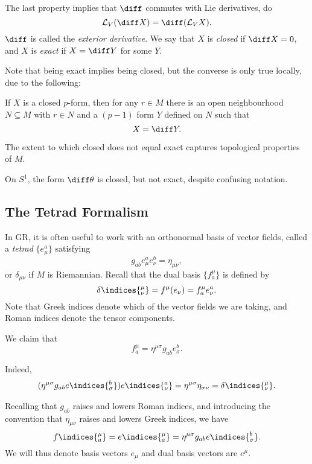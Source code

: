 \documentclass[12pt]{article}
\begin{document}
The last property implies that $\diff$ commutes with Lie derivatives, do
\[
\mathcal{L}_V(\diff X) = \diff (\mathcal{L}_V X).
\]
$\diff$ is called the \emph{exterior derivative}. We say that $X$ is \emph{closed} if $\diff X = 0$, and $X$ is \emph{exact} if $X = \diff Y$ for some $Y$.

Note that being exact implies being closed, but the converse is only true locally, due to the following:
\begin{lemma}
	If $X$ is a closed $p$-form, then for any $r \in M$ there is an open neighbourhood $N \subseteq M$ with $r \in N$ and a $(p-1)$ form $Y$ defined on $N$ such that
	\[
	X = \diff Y.
	\]
\end{lemma}
The extent to which closed does not equal exact captures topological properties of $M$.
\begin{exbox}
	On $S^1$, the form $\diff \theta$ is closed, but not exact, despite confusing notation.
\end{exbox}

\subsection{The Tetrad Formalism}%
\label{sub:ttf}

In GR, it is often useful to work with an orthonormal basis of vector fields, called a \emph{tetrad} $\{e_\mu^a\}$ satisfying
\[
g_{ab} e_\mu^a e_\nu^b = \eta_{\mu\nu},
\]
or $\delta_{\mu\nu}$ if $M$ is Riemannian. Recall that the dual basis $\{f_a^\mu\}$ is defined by
\[
\delta\indices{^{\mu}_{\nu}} = f^\mu(e_\nu) = f^{\mu}_a e^{a}_\nu.
\]
Note that Greek indices denote which of the vector fields we are taking, and Roman indices denote the tensor components.

We claim that
\[
f^{\mu}_a = \eta^{\mu\sigma} g_{ab} e^{b}_\sigma.
\]

\begin{proofbox}
	Indeed,
	\begin{align*}
		(\eta^{\mu\sigma} g_{ab} e\indices{^{b}_{\sigma}}) e\indices{^{a}_{\nu}} = \eta^{\mu\sigma} \eta_{\sigma\nu} = \delta\indices{^{\mu}_{\nu}}.
	\end{align*}
\end{proofbox}

Recalling that $g_{ab}$ raises and lowers Roman indices, and introducing the convention that $\eta_{\mu\nu}$ raises and lowers Greek indices, we have
\[
f\indices{^{\mu}_{a}} = e\indices{^{\mu}_{a}} = \eta^{\mu\sigma} g_{ab} e\indices{^{b}_{\sigma}}.
\]
We will thus denote basis vectors $e_\mu$ and dual basis vectors are $e^\mu$.
\end{document}
